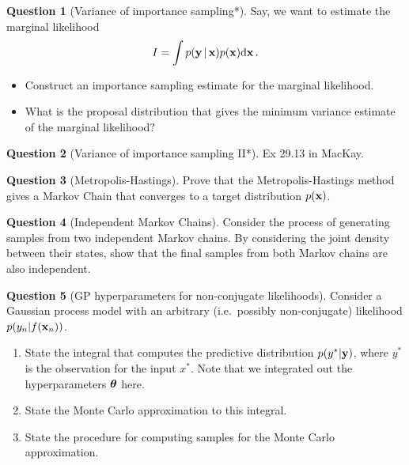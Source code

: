 \documentclass[a4paper]{article}
\theoremstyle{definition}
\newtheorem{question}{Question}
\begin{document}
\begin{question}[Variance of importance sampling*]
\label{q:importance-sampling-variance}
Say, we want to estimate the marginal likelihood
\begin{align}
I = \int p(\mathbf{y}\,|\,\mathbf{x}) p(\mathbf{x})\mathrm{d}{\mathbf{x}} \,.
\end{align}
\begin{itemize}
\item Construct an importance sampling estimate for the marginal likelihood.
\item What is the proposal distribution that gives the minimum variance estimate of the marginal likelihood?
\end{itemize}
\end{question}


\begin{question}[Variance of importance sampling II*]
\label{q:importance-sampling-variance-2}
Ex 29.13 in MacKay.
\end{question}


\begin{question}[Metropolis-Hastings]
Prove that the Metropolis-Hastings method gives a Markov Chain that converges to a target distribution $p(\mathbf{x})$.
\end{question}



\begin{question}[Independent Markov Chains]
\label{q:independent-chains}
Consider the process of generating samples from two independent Markov chains. By considering the joint density between their states, show that the final samples from both Markov chains are also independent.
\end{question}

\begin{question}[GP hyperparameters for non-conjugate likelihoods]
\label{q:hyperparam-non-conjugate-gp-likelihoods}
Consider a Gaussian process model with an arbitrary (i.e.~possibly non-conjugate) likelihood $p(y_n|f(\mathbf{x}_n))$.
\begin{enumerate}
  \item State the integral that computes the predictive distribution $p(y^*|\mathbf{y})$, where $y^*$ is the observation for the input $x^*$. Note that we integrated out the hyperparameters $\boldsymbol{\theta}$ here.
  \item State the Monte Carlo approximation to this integral.
  \item State the procedure for computing samples for the Monte Carlo approximation.
\end{enumerate}
\end{question}
\end{document}
